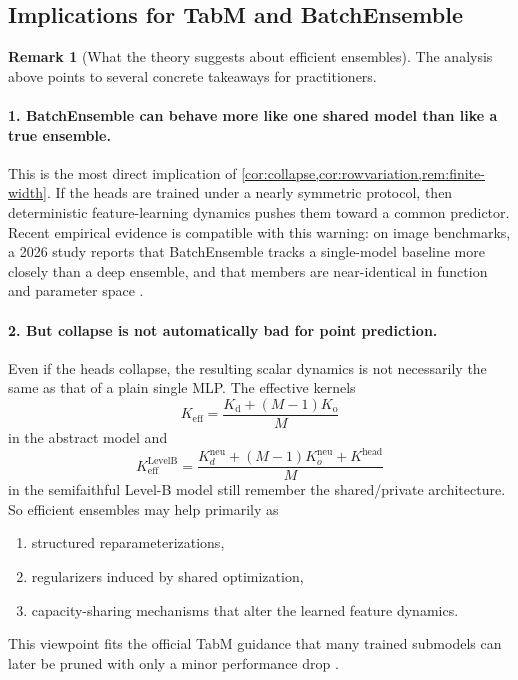 \documentclass[11pt]{article}
\theoremstyle{definition}
\newtheorem{remark}[theorem]{Remark}
\begin{document}
\subsection{Implications for TabM and BatchEnsemble}

\begin{remark}[What the theory suggests about efficient ensembles]
\label{rem:practitioner}
The analysis above points to several concrete takeaways for practitioners.
\end{remark}

\paragraph{1. BatchEnsemble can behave more like one shared model than like a true ensemble.}
This is the most direct implication of \cref{cor:collapse,cor:rowvariation,rem:finite-width}.
If the heads are trained under a nearly symmetric protocol, then deterministic feature-learning dynamics pushes them toward a common predictor.
Recent empirical evidence is compatible with this warning:
on image benchmarks, a 2026 study reports that BatchEnsemble tracks a single-model baseline more closely than a deep ensemble, and that members are near-identical in function and parameter space \cite{zamyatin2026}.

\paragraph{2. But collapse is not automatically bad for point prediction.}
Even if the heads collapse, the resulting scalar dynamics is not necessarily the same as that of a plain single MLP.
The effective kernels
\[
  K_{\mathrm{eff}}=\frac{K_{\mathrm d}+(M-1)K_{\mathrm o}}{M}
\]
in the abstract model and
\[
  K_{\mathrm{eff}}^{\mathrm{LevelB}}
  =
  \frac{
    K_d^{\mathrm{neu}}+(M-1)K_o^{\mathrm{neu}}+K^{\mathrm{head}}
  }{M}
\]
in the semifaithful Level-B model still remember the shared/private architecture.
So efficient ensembles may help primarily as
\begin{enumerate}[leftmargin=2em]
  \item structured reparameterizations,
  \item regularizers induced by shared optimization,
  \item capacity-sharing mechanisms that alter the learned feature dynamics.
\end{enumerate}
This viewpoint fits the official TabM guidance that many trained submodels can later be pruned with only a minor performance drop \cite{tabm-repo}.
\end{document}
